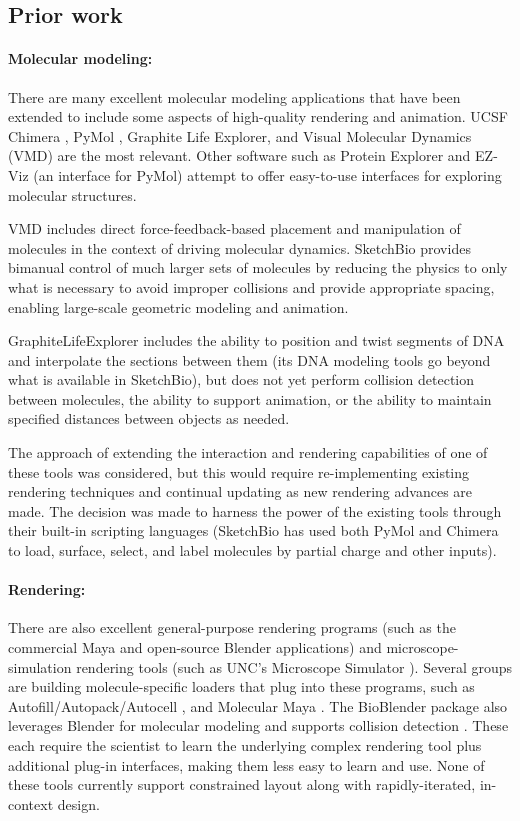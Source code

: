 \documentclass[twocolumn]{bmcart}%
\begin{document}
\subsection*{Prior work}
\paragraph*{Molecular modeling:}
There are many excellent molecular modeling applications that have been extended to include some aspects of high-quality rendering and animation.
UCSF Chimera \cite{pettersen2004ucsf}, PyMol \cite{pymol2013}, Graphite Life Explorer\cite{hornus2013easy}, and Visual Molecular Dynamics (VMD) \cite{humphrey1996} are the most relevant.
Other software such as Protein Explorer \cite{martz2002protein} and EZ-Viz \cite{grell2006ez} (an interface for PyMol) attempt to offer easy-to-use interfaces for exploring molecular structures.

VMD includes direct force-feedback-based placement and manipulation of molecules in the context of driving molecular dynamics.  SketchBio provides bimanual control of much larger sets of molecules by reducing the physics to only what is necessary to avoid improper collisions and provide appropriate spacing, enabling large-scale geometric modeling and animation.

GraphiteLifeExplorer includes the ability to position and twist segments of DNA and interpolate the sections between them (its DNA modeling tools go beyond what is available in SketchBio), but does not yet perform collision detection between molecules, the ability to support animation, or the ability to maintain specified distances between objects as needed.

The approach of extending the interaction and rendering capabilities of one of these tools was considered, but this would require re-implementing existing rendering techniques and continual updating as new rendering advances are made.
The decision was made to harness the power of the existing tools through their built-in scripting languages (SketchBio has used both PyMol and Chimera to load, surface, select, and label molecules by partial charge and other inputs).

\paragraph*{Rendering:}
There are also excellent general-purpose rendering programs (such as the commercial Maya and open-source Blender applications) and microscope-simulation rendering tools (such as UNC's Microscope Simulator \cite{quammen2008}).
Several groups are building molecule-specific loaders that plug into these programs, such as Autofill/Autopack/Autocell \cite{Johnson2013}, and Molecular Maya \cite{molecularmaya}. The BioBlender package also leverages Blender for molecular modeling and supports collision detection \cite{zini2010bioblender}. These each require the scientist to learn the underlying complex rendering tool plus additional plug-in interfaces, making them less easy to learn and use. None of these tools currently support constrained layout along with rapidly-iterated, in-context design.
\end{document}
